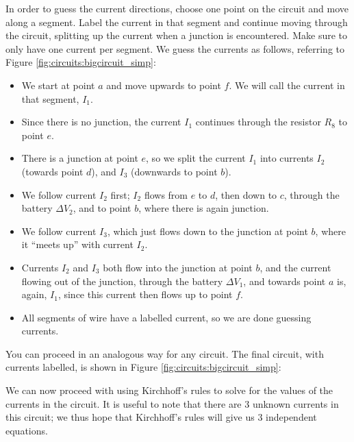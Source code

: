 In order to guess the current directions, choose one point on the circuit and move along a segment. Label the current in that segment and continue moving through the circuit, splitting up the current when a junction is encountered. Make sure to only have one current per segment. We guess the currents as follows, referring to Figure \ref{fig:circuits:bigcircuit_simp}:
\begin{itemize}
\item We start at point $a$ and move upwards to point $f$. We will call the current in that segment, $I_1$.
\item Since there is no junction, the current $I_1$ continues through the resistor $R_8$ to point $e$. 
\item There is a junction at point $e$, so we split the current $I_1$ into currents $I_2$ (towards point $d$), and $I_3$ (downwards to point $b$).
\item We follow current $I_2$ first; $I_2$ flows from $e$ to $d$, then down to $c$, through the battery $\Delta V_2$, and to point $b$, where there is again junction. 
\item We follow current $I_3$, which just flows down to the junction at point $b$, where it ``meets up'' with current $I_2$. 
\item Currents $I_2$ and $I_3$ both flow into the junction at point $b$, and the current flowing out of the junction, through the battery $\Delta V_1$, and towards point $a$ is, again, $I_1$, since this current then flows up to point $f$. 
\item All segments of wire have a labelled current, so we are done guessing currents.
\end{itemize}  
You can proceed in an analogous way for any circuit. The final circuit, with currents labelled, is shown in Figure \ref{fig:circuits:bigcircuit_simp}:


We can now proceed with using Kirchhoff's rules to solve for the values of the currents in the circuit. It is useful to note that there are 3 unknown currents in this circuit; we thus hope that Kirchhoff's rules will give us 3 independent equations.


